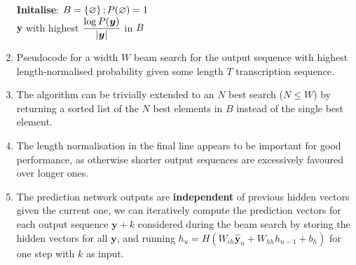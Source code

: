 \begin{enumerate}
\begin{algorithm}[H]
    \textbf{Initalise}: $B = \left\{\varnothing\right\}; P(\varnothing) = 1$ \\
    \Return $\bm{y}$ with highest $\dfrac{\log P(\bm{y})}{\left| \bm{y} \right|}$ in $B$
\end{algorithm}

    \item Pseudocode for a width $W$ beam search for the output sequence with highest length-normalised probability given some length $T$ transcription sequence.
    \hfill \cite{arxiv/1211.3711/Sequence-Transduction-RNN}

    \item The algorithm can be trivially extended to an $N$ best search ($N \leq W $) by returning a sorted list of the $N$ best elements in $B$ instead of the single best element.
    \hfill \cite{arxiv/1211.3711/Sequence-Transduction-RNN}

    \item The length normalisation in the final line appears to be important for good performance, as otherwise shorter output sequences are excessively favoured over longer ones.
    \hfill \cite{arxiv/1211.3711/Sequence-Transduction-RNN}

    \item The prediction network outputs are \textbf{independent} of previous hidden vectors given the current one, we can iteratively compute the prediction vectors for each output sequence $\bm{y} + k$ considered during the beam search by storing the hidden vectors for all $\bm{y}$, and running $h_u = H (W_{ih} \hat{\bm{y}}_u + W_{hh}h_{u-1} + b_h)$ for one step with $k$ as input. 
    \hfill \cite{arxiv/1211.3711/Sequence-Transduction-RNN}


\end{enumerate}
